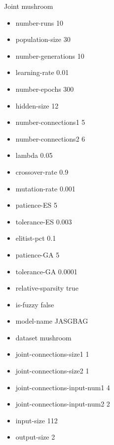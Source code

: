 Joint
mushroom
\begin{itemize}
\item number-runs 10
\item population-size 30
\item number-generations 10
\item learning-rate 0.01
\item number-epochs 300
\item hidden-size 12
\item number-connections1 5
\item number-connections2 6
\item lambda 0.05
\item crossover-rate 0.9
\item mutation-rate 0.001
\item patience-ES 5
\item tolerance-ES 0.003
\item elitist-pct 0.1
\item patience-GA 5
\item tolerance-GA 0.0001
\item relative-sparsity true
\item is-fuzzy false
\item model-name JASGBAG
\item dataset mushroom
\item joint-connections-size1 1
\item joint-connections-size2 1
\item joint-connections-input-num1 4
\item joint-connections-input-num2 2
\item input-size 112
\item output-size 2
\end{itemize}

